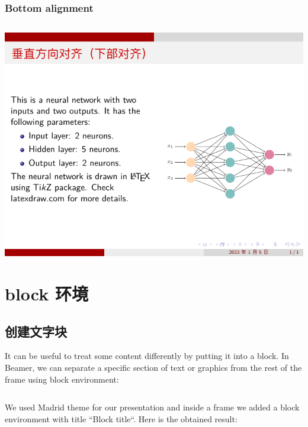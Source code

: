 \subsubsection{Bottom alignment}

\inputminted[linenos=true]{latex}{examples/beamer/beamercolumn06.tex}

\includegraphics{examples/beamer/beamercolumn06.pdf}

\section{{\ttfamily block} 环境}

\subsection{创建文字块}

It can be useful to treat some content differently by putting it into a block. In Beamer, we can separate a specific section of text or graphics from the rest of the frame using {\ttfamily block} environment:

\inputminted[linenos=true]{latex}{examples/beamer/beamerblock01.tex}

We used {\ttfamily Madrid} theme for our presentation and inside a frame we added a block environment with title “Block title“. Here is the obtained result:

